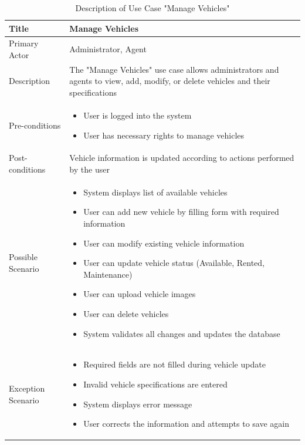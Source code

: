 \begin{table}[H]
    \centering
    \vspace{0.5cm}
    \caption{Description of Use Case "Manage Vehicles"}
    \vspace{0.3cm}
    \begin{tabular}{|p{3cm}|p{12cm}|}
        \hline
        Title & Manage Vehicles \\
        \hline
        Primary Actor & Administrator, Agent \\
        \hline
        Description & The "Manage Vehicles" use case allows administrators and agents to view, add, modify, or delete vehicles and their specifications \\
        \hline
        Pre-conditions & \begin{itemize}
            \item User is logged into the system
            \item User has necessary rights to manage vehicles
        \end{itemize} \\
        \hline
        Post-conditions & Vehicle information is updated according to actions performed by the user \\
        \hline
        Possible Scenario & \begin{itemize}
       
            \item System displays list of available vehicles
            \item User can add new vehicle by filling form with required information
            \item User can modify existing vehicle information
            \item User can update vehicle status (Available, Rented, Maintenance)
            \item User can upload vehicle images
            \item User can delete vehicles
            \item System validates all changes and updates the database
        \end{itemize} \\
        \hline
        Exception Scenario & \begin{itemize}
            \item Required fields are not filled during vehicle update
            \item Invalid vehicle specifications are entered
            \item System displays error message
            \item User corrects the information and attempts to save again
        \end{itemize} \\
        \hline
    \end{tabular}
    \vspace{0.5cm}
\end{table}

